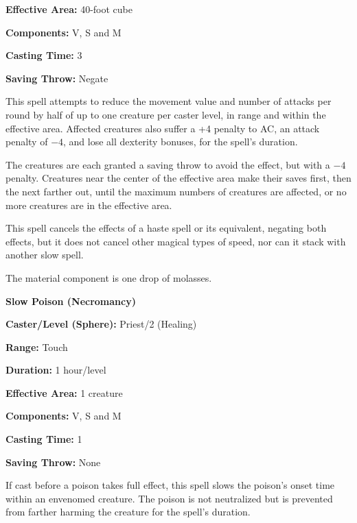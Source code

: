 \begin{multicols}{2}
\begin{minipage}{\columnwidth}
\noindent \textbf{Effective Area:} 40-foot cube

\noindent \textbf{Components:} V, S and M

\noindent \textbf{Casting Time:} 3

\noindent \textbf{Saving Throw:} Negate

\end{minipage}

This spell attempts to reduce the movement value and number of attacks per round by half of up to one creature per caster level, in range and within the effective area.  Affected creatures also suffer a +4 penalty to AC, an attack penalty of $-4$, and lose all dexterity bonuses, for the spell's duration.  

The creatures are each granted a saving throw to avoid the effect, but with a $-4$ penalty.  Creatures near the center of the effective area make their saves first, then the next farther out, until the maximum numbers of creatures are affected, or no more creatures are in the effective area.  

This spell cancels the effects of a haste spell or its equivalent, negating both effects, but it does not cancel other magical types of speed, nor can it stack with another slow spell.

The material component is one drop of molasses.  

\vspace{1em}

\noindent
\begin{minipage}{\columnwidth}

\noindent \textbf{Slow Poison (Necromancy)}

\noindent \textbf{Caster/Level (Sphere):} Priest/2 (Healing)

\noindent \textbf{Range:} Touch

\noindent \textbf{Duration:} 1 hour/level

\noindent \textbf{Effective Area:} 1 creature

\noindent \textbf{Components:} V, S and M

\noindent \textbf{Casting Time:} 1

\noindent \textbf{Saving Throw:} None

\end{minipage}

If cast before a poison takes full effect, this spell slows the poison's onset time within an envenomed creature.  The poison is not neutralized but is prevented from farther harming the creature for the spell's duration.  


\end{multicols}
